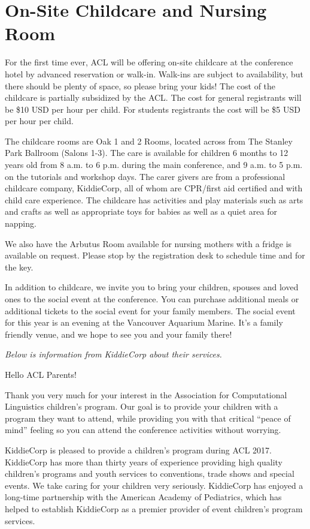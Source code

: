 \chapter{On-Site Childcare and Nursing Room}


For the first time ever, ACL will be offering on-site childcare at the conference hotel by advanced reservation or walk-in.   Walk-ins are subject to availability, but there should be plenty of space, so please bring your kids!  The cost of the childcare is partially subsidized by the ACL. The cost for general registrants will be \$10 USD per hour per child. For students registrants the cost will be \$5 USD per hour per child.

The childcare rooms are Oak 1 and 2 Rooms, located across from The Stanley Park Ballroom (Salons 1-3). The care is available for children 6 months to 12 years old from 8 a.m. to 6 p.m. during the main conference, and  9 a.m. to 5 p.m. on the tutorials and workshop days. The carer givers are from a professional childcare company, KiddieCorp, all of whom are CPR/first aid certified and with child care experience. The childcare has activities and play materials such as arts and crafts as well as appropriate toys for babies as well as a quiet area for napping.  

We also have the Arbutus Room available for nursing mothers with a fridge is available on request. Please stop by the registration desk to schedule time and for the key.

In addition to childcare, we invite you to bring your children, spouses and loved ones to the social event at the conference. You can purchase additional meals or additional tickets to the social event for your family members. The social event for this year is an evening at the Vancouver Aquarium Marine. It's a family friendly venue, and we hope to see you and your family there!

\emph{Below is information from KiddieCorp about their services.}

Hello ACL Parents!
 
Thank you very much for your interest in the Association for Computational Linguistics children's program. Our goal is to provide your children with a program they want to attend, while providing you with that critical ``peace of mind'' feeling so you can attend the conference activities without worrying.

KiddieCorp is pleased to provide a children's program during ACL 2017. KiddieCorp has more than thirty years of experience providing high quality children's programs and youth services to conventions, trade shows and special events. We take caring for your children very seriously. KiddieCorp has enjoyed a long-time partnership with the American Academy of Pediatrics, which has helped to establish KiddieCorp as a premier provider of event children's program services.

